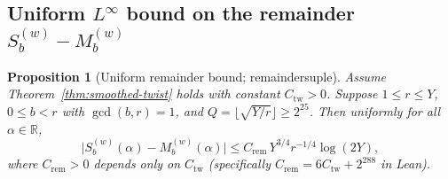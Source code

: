 \documentclass[11pt,reqno]{amsart}
\numberwithin{equation}{section}
\newtheorem{proposition}[theorem]{Proposition}
\theoremstyle{definition}
\newcommand{\R}{\mathbb{R}}
\newcommand{\1}{\mathbf{1}}
\newcommand{\lean}[1]{{\footnotesize\ttfamily\renewcommand{\_}{\textunderscore\allowbreak}#1}}
\begin{document}
\subsection{Uniform \texorpdfstring{$L^\infty$}{L-infinity} bound on the remainder \texorpdfstring{$S_b^{(w)} - M_b^{(w)}$}{Sb - Mb}}

\begin{proposition}[Uniform remainder bound; \lean{remainder\_sup\_le}]
\label{prop:rem-sup}
Assume Theorem~\ref{thm:smoothed-twist} holds with constant $C_{\mathrm{tw}} > 0$. Suppose $1 \le r \le Y$, $0 \le b < r$ with $\gcd(b, r) = 1$, and $Q = \lfloor \sqrt{Y/r} \rfloor \ge 2^{25}$. Then uniformly for all $\alpha \in \R$,
\begin{equation}\label{eq:rem-sup}
  \bigl|S_b^{(w)}(\alpha) - M_b^{(w)}(\alpha)\bigr|
  \le C_{\mathrm{rem}}\, Y^{3/4} r^{-1/4} \log(2Y),
\end{equation}
where $C_{\mathrm{rem}} > 0$ depends only on $C_{\mathrm{tw}}$ (specifically $C_{\mathrm{rem}} = 6 C_{\mathrm{tw}} + 2^{288}$ in Lean).
\end{proposition}
\end{document}
